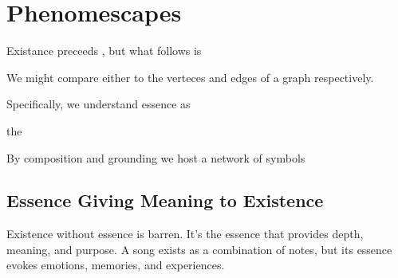 \section{Phenomescapes}

Existance preceeds , but what follows is

We might compare either to the verteces and edges of a graph respectively.

Specifically, we understand essence as

the 

By composition and grounding we host a network of symbols





\subsection{Essence Giving Meaning to Existence}
Existence without essence is barren. It's the essence that provides depth, meaning, and purpose. A song exists as a combination of notes, but its essence evokes emotions, memories, and experiences.